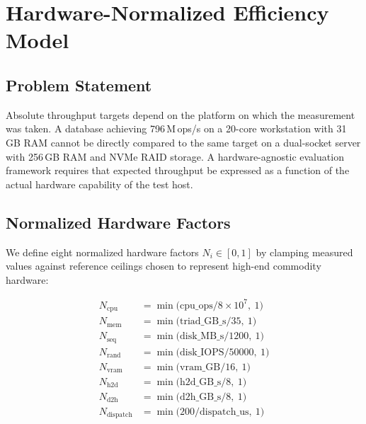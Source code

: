 \documentclass[conference]{IEEEtran}
\begin{document}
\section{Hardware-Normalized Efficiency Model}
\label{sec:hwmodel}

\subsection{Problem Statement}
\label{ssec:prob}

Absolute throughput targets depend on the platform on which the
measurement was taken.
A database achieving 796\,M\,ops/s on a 20-core workstation with
31\,GB RAM cannot be directly compared to the same target on a
dual-socket server with 256\,GB RAM and NVMe RAID storage.
A hardware-agnostic evaluation framework requires that expected
throughput be expressed as a function of the actual hardware
capability of the test host.

\subsection{Normalized Hardware Factors}
\label{ssec:norm-factors}

We define eight normalized hardware factors
$N_i \in [0, 1]$ by clamping measured values against reference
ceilings chosen to represent high-end commodity hardware:

\begin{align}
  N_{\text{cpu}}      &= \min\!\bigl(\text{cpu\_ops} / 8{\times}10^{7},\ 1\bigr) \label{eq:ncpu}\\
  N_{\text{mem}}      &= \min\!\bigl(\text{triad\_GB\_s} / 35,\ 1\bigr) \label{eq:nmem}\\
  N_{\text{seq}}      &= \min\!\bigl(\text{disk\_MB\_s} / 1200,\ 1\bigr) \label{eq:nseq}\\
  N_{\text{rand}}     &= \min\!\bigl(\text{disk\_IOPS} / 50000,\ 1\bigr) \label{eq:nrand}\\
  N_{\text{vram}}     &= \min\!\bigl(\text{vram\_GB} / 16,\ 1\bigr) \label{eq:nvram}\\
  N_{\text{h2d}}      &= \min\!\bigl(\text{h2d\_GB\_s} / 8,\ 1\bigr) \label{eq:nh2d}\\
  N_{\text{d2h}}      &= \min\!\bigl(\text{d2h\_GB\_s} / 8,\ 1\bigr) \label{eq:nd2h}\\
  N_{\text{dispatch}} &= \min\!\bigl(200 / \text{dispatch\_us},\ 1\bigr) \label{eq:ndisp}
\end{align}
\end{document}
